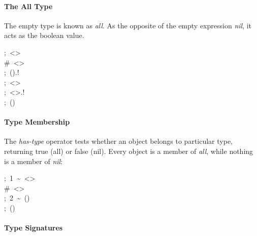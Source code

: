 \documentclass[preprint]{{acmart}}
\begin{document}
\paragraph{The All Type}\label{sec-the-all-type}%

\noindent{}The empty type \mdcode{\textless{}\textgreater{}} is known as \emph{all}. As the opposite of the empty expression \mdcode{()} \emph{nil},
it acts as the boolean  value.%
\begin{mdpre}%
\noindent;~\textless{}\textgreater{}\\
{\#~\textless{}\textgreater{}}\\
;~().!\\
;~\textless{}\textgreater{}\\
;~\textless{}\textgreater{}.!\\
;~()%
\end{mdpre}
\paragraph{Type Membership}\label{sec-type-membership}%

\noindent{}The \emph{has-type} operator \mdcode{\textasciitilde{}} tests whether an object belongs to particular
type, returning true (all) or false (nil). Every object is a member of
\emph{all}, while nothing is a member of \emph{nil}:%
\begin{mdpre}%
\noindent;~1~\textasciitilde{}~\textless{}\textgreater{}\\
{\#~\textless{}\textgreater{}}\\
;~2~\textasciitilde{}~()\\
;~()%
\end{mdpre}
\paragraph{Type Signatures}\label{sec-type-signatures}%
\end{document}
